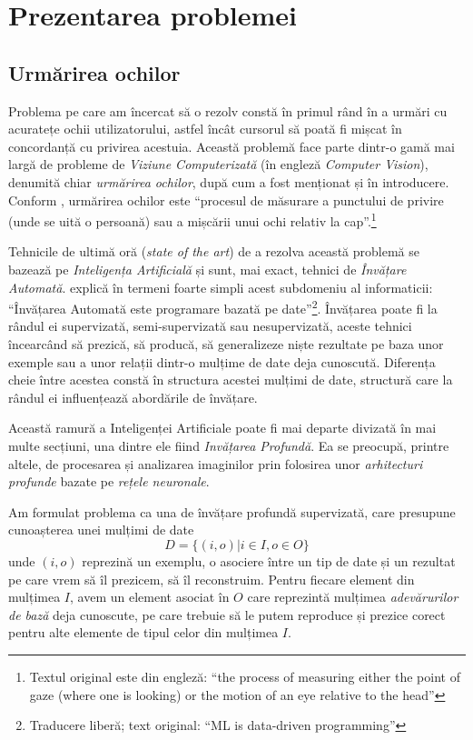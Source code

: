 \chapter{Prezentarea problemei}
\label{chapter1}
\section{Urmărirea ochilor}
Problema pe care am încercat să o rezolv constă în primul rând în a urmări cu acuratețe ochii utilizatorului, astfel încât cursorul să poată fi mișcat în concordanță cu privirea acestuia.
Această problemă face parte dintr-o gamă mai largă de probleme de \emph{Viziune Computerizată} (în engleză \emph{Computer Vision}), denumită chiar \emph{urmărirea ochilor}, după cum a fost menționat și în introducere.
Conform \cite{eye_tracking}, urmărirea ochilor este ``procesul de măsurare a punctului de privire (unde se uită o persoană) sau a mișcării unui ochi relativ la cap''.\footnote{Textul original este din engleză: ``the process of measuring either the point of gaze (where one is looking) or the motion of an eye relative to the head''}

Tehnicile de ultimă oră (\emph{state of the art}) de a rezolva această problemă se bazează pe \emph{Inteligența Artificială} și sunt, mai exact, tehnici de \emph{Învățare Automată}.
\cite{liviu_ciortuz_ml} explică în termeni foarte simpli acest subdomeniu al informaticii: ``Învățarea Automată este programare bazată pe date''\footnote{Traducere liberă; text original: ``ML is data-driven programming''}.
Învățarea poate fi la rândul ei supervizată, semi-supervizată sau nesupervizată, aceste tehnici încearcând să prezică, să producă, să generalizeze niște rezultate pe baza unor exemple sau a unor relații dintr-o mulțime de date deja cunoscută.
Diferența cheie între acestea constă în structura acestei mulțimi de date, structură care la rândul ei influențează abordările de învățare.

Această ramură a Inteligenței Artificiale poate fi mai departe divizată în mai multe secțiuni, una dintre ele fiind \emph{Invățarea Profundă}.
Ea se preocupă, printre altele, de procesarea și analizarea imaginilor prin folosirea unor \emph{arhitecturi profunde} bazate pe \emph{rețele neuronale}.

Am formulat problema ca una de învățare profundă supervizată, care presupune cunoașterea unei mulțimi de date
$$D = \{(i, o) | i \in I, o \in O\}$$
unde $(i, o)$ reprezină un exemplu, o asociere între un tip de date și un rezultat pe care vrem să îl prezicem, să îl reconstruim.
Pentru fiecare element din mulțimea $I$, avem un element asociat în $O$ care reprezintă mulțimea \emph{adevărurilor de bază} deja cunoscute, pe care trebuie să le putem reproduce și prezice corect pentru alte elemente de tipul celor din mulțimea $I$.

